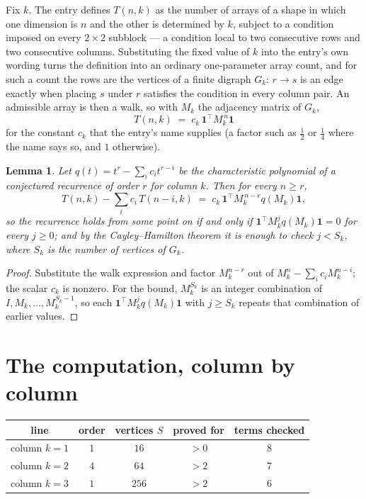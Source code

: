 \documentclass[11pt,a4paper]{article}
\theoremstyle{plain}
\newtheorem{lemma}[theorem]{Lemma}
\theoremstyle{definition}
\begin{document}
Fix $k$. The entry defines $T(n,k)$ as the number of arrays of a shape in which one dimension
is $n$ and the other is determined by $k$, subject to a condition imposed on every
$2\times2$ subblock --- a condition local to two consecutive rows and two consecutive columns.
Substituting the fixed value of $k$ into the entry's own wording turns the definition into an
ordinary one-parameter array count, and for such a count the rows are the vertices of a finite
digraph $G_k$: $r\to s$ is an edge exactly when placing $s$ under $r$ satisfies the condition
in every column pair. An admissible array is then a walk, so with $M_k$ the adjacency matrix
of $G_k$,
\[
T(n,k)\;=\;c_k\,\mathbf{1}^{\!\top}M_k^{\,n}\mathbf{1}
\]
for the constant $c_k$ that the entry's name supplies (a factor such as $\tfrac12$ or
$\tfrac14$ where the name says so, and $1$ otherwise).

\begin{lemma}\label{lem:crit}
Let $q(t)=t^{r}-\sum_i c_it^{r-i}$ be the characteristic polynomial of a conjectured
recurrence of order $r$ for column $k$. Then for every $n\ge r$,
\[
T(n,k)-\sum_i c_i\,T(n-i,k)\;=\;c_k\,\mathbf{1}^{\!\top}M_k^{\,n-r}q(M_k)\mathbf{1},
\]
so the recurrence holds from some point on if and only if
$\mathbf{1}^{\!\top}M_k^{j}q(M_k)\mathbf{1}=0$ for every $j\ge0$; and by the
Cayley--Hamilton theorem it is enough to check $j<S_k$, where $S_k$ is the number of vertices
of $G_k$.
\end{lemma}

\begin{proof}
Substitute the walk expression and factor $M_k^{n-r}$ out of $M_k^{n}-\sum_ic_iM_k^{n-i}$;
the scalar $c_k$ is nonzero. For the bound, $M_k^{S_k}$ is an integer combination of
$I,M_k,\dots,M_k^{S_k-1}$, so each $\mathbf{1}^{\!\top}M_k^{j}q(M_k)\mathbf{1}$ with
$j\ge S_k$ repeats that combination of earlier values.
\end{proof}

\section{The computation, column by column}

\begin{center}
\begin{tabular}{ccccc}
line & order & vertices $S$ & proved for & terms checked \\ \hline
column $k$$=1$ & $1$ & $16$ & $>0$ & $8$ \\
column $k$$=2$ & $4$ & $64$ & $>2$ & $7$ \\
column $k$$=3$ & $1$ & $256$ & $>2$ & $6$ \\
\end{tabular}
\end{center}
\end{document}

